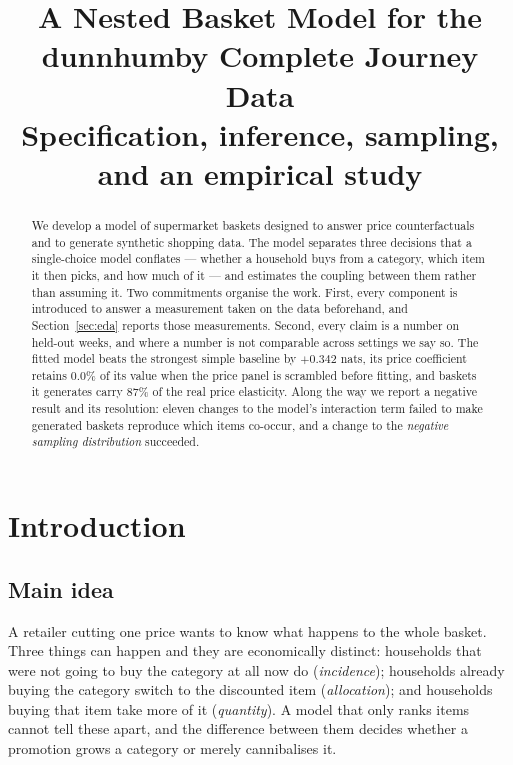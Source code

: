 \documentclass[11pt]{article}
\title{A Nested Basket Model for the dunnhumby Complete Journey Data\\
\large Specification, inference, sampling, and an empirical study}
\author{}
\date{}
\begin{document}
\maketitle

\begin{abstract}
\noindent
We develop a model of supermarket baskets designed to answer price counterfactuals and
to generate synthetic shopping data. The model separates three decisions that a
single-choice model conflates --- whether a household buys from a category, which item
it then picks, and how much of it --- and estimates the coupling between them rather
than assuming it. Two commitments organise the work. First, every component is
introduced to answer a measurement taken on the data beforehand, and Section~\ref{sec:eda}
reports those measurements. Second, every claim is a number on held-out weeks, and where
a number is not comparable across settings we say so. The fitted model beats the
strongest simple baseline by $+0.342$ nats, its price coefficient retains 0.0\%
of its value when the price panel is scrambled before fitting, and baskets it generates
carry 87\% of the real price elasticity. Along the way we report a negative
result and its resolution: eleven changes to the model's interaction term failed to make
generated baskets reproduce which items co-occur, and a change to the \emph{negative
sampling distribution} succeeded.
\end{abstract}

\tableofcontents

\section{Introduction}

\subsection{Main idea}

A retailer cutting one price wants to know what happens to the whole basket. Three
things can happen and they are economically distinct: households that were not going to
buy the category at all now do (\emph{incidence}); households already buying the
category switch to the discounted item (\emph{allocation}); and households buying that
item take more of it (\emph{quantity}). A model that only ranks items cannot tell these
apart, and the difference between them decides whether a promotion grows a category or
merely cannibalises it.
\end{document}

